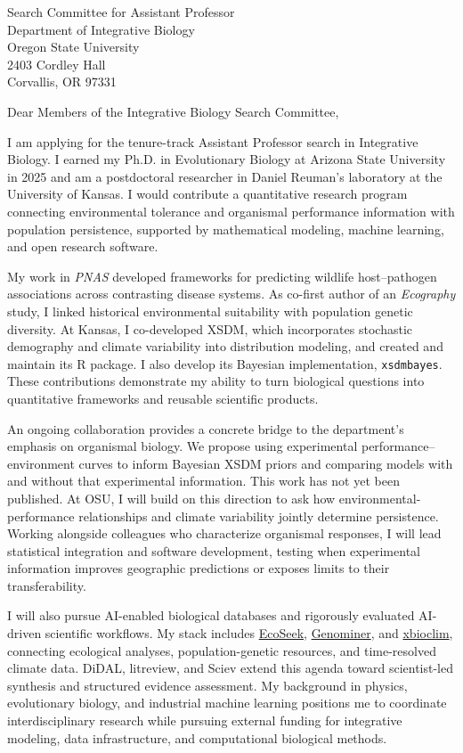 \documentclass[11pt,letterpaper]{letter}
\date{October 1, 2026}
\begin{document}
\begin{letter}{
Search Committee for Assistant Professor\\
Department of Integrative Biology\\
Oregon State University\\
2403 Cordley Hall\\
Corvallis, OR 97331
}

\opening{Dear Members of the Integrative Biology Search Committee,}

I am applying for the tenure-track Assistant Professor search in Integrative Biology. I earned my Ph.D. in Evolutionary Biology at Arizona State University in 2025 and am a postdoctoral researcher in Daniel Reuman's laboratory at the University of Kansas. I would contribute a quantitative research program connecting environmental tolerance and organismal performance information with population persistence, supported by mathematical modeling, machine learning, and open research software.

My work in \emph{PNAS} developed frameworks for predicting wildlife host--pathogen associations across contrasting disease systems. As co-first author of an \emph{Ecography} study, I linked historical environmental suitability with population genetic diversity. At Kansas, I co-developed XSDM, which incorporates stochastic demography and climate variability into distribution modeling, and created and maintain its R package. I also develop its Bayesian implementation, \texttt{xsdmbayes}. These contributions demonstrate my ability to turn biological questions into quantitative frameworks and reusable scientific products.

An ongoing collaboration provides a concrete bridge to the department's emphasis on organismal biology. We propose using experimental performance--environment curves to inform Bayesian XSDM priors and comparing models with and without that experimental information. This work has not yet been published. At OSU, I will build on this direction to ask how environmental-performance relationships and climate variability jointly determine persistence. Working alongside colleagues who characterize organismal responses, I will lead statistical integration and software development, testing when experimental information improves geographic predictions or exposes limits to their transferability.

I will also pursue AI-enabled biological databases and rigorously evaluated AI-driven scientific workflows. My stack includes \href{https://ecoseek.org}{EcoSeek}, \href{https://genominer.ecoseek.org}{Genominer}, and \href{https://xbioclim.org}{xbioclim}, connecting ecological analyses, population-genetic resources, and time-resolved climate data. DiDAL, litreview, and Sciev extend this agenda toward scientist-led synthesis and structured evidence assessment. My background in physics, evolutionary biology, and industrial machine learning positions me to coordinate interdisciplinary research while pursuing external funding for integrative modeling, data infrastructure, and computational biological methods.


\end{letter}
\end{document}
